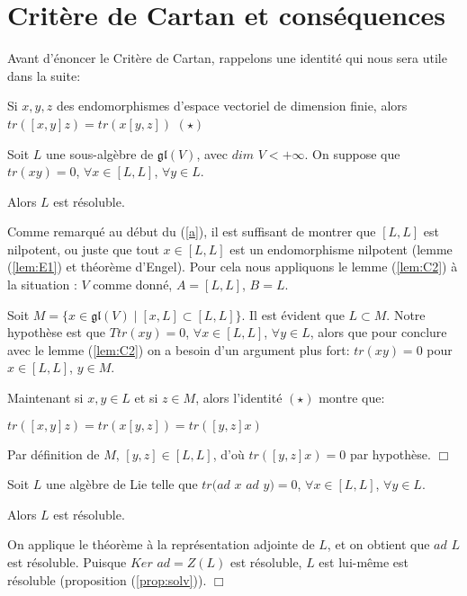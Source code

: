 \documentclass[a4paper,openany,12pt]{report}
\newcommand{\gl}{\mathfrak{gl}}
\theoremstyle{break}
{\theorembodyfont{\upshape}
\newtheorem*{rmq}{Remarque :}
\newtheorem*{prv}{Preuve :}
\newtheorem*{ex}{Exemples :}
\newtheorem*{exe}{Exemple : }
\newtheorem*{nota}{Notation :}
\newtheorem*{dem}{D\'emonstration :}}
\begin{document}
\section{Critère de Cartan et conséquences}\label{c}

Avant d'énoncer le Critère de Cartan, rappelons une identité qui nous sera utile dans la suite:  
\begin{center}
Si $x,y,z$ des endomorphismes d'espace vectoriel de dimension finie, alors $tr([x,y]z)=tr(x[y,z])$ $(\star)$
\end{center}

\begin{thm}\label{cartan}
Soit $L$ une sous-algèbre de $\gl(V)$, avec $dim$ $V<+\infty$. On suppose que $tr(xy)=0$, $\forall x \in [L,L]$, $\forall y \in L$.

Alors $L$ est résoluble. 
\end{thm}

\begin{dem}
\quad Comme remarqué au début du (\ref{a}), il est suffisant de montrer que $[L,L]$ est nilpotent, ou juste que tout $x \in [L,L]$ est un endomorphisme nilpotent (lemme (\ref{lem:E1}) et théorème d'Engel). Pour cela nous appliquons le lemme (\ref{lem:C2}) à la situation : $V$ comme donné, $A=[L,L]$, $B=L$.

Soit $M= \{ x \in \gl(V) \mid [x,L] \subset [L,L] \}$. Il est évident que $L \subset M$. Notre hypothèse est que $Ttr(xy)=0$, $\forall x \in [L,L]$, $\forall y \in L$, alors que pour conclure avec le lemme (\ref{lem:C2}) on a besoin d'un argument plus fort: \quad $tr(xy)=0$ pour $x \in [L,L]$, $y \in M$.

Maintenant si $x,y \in L$ et si $z \in M$, alors l'identité $(\star)$ montre que:
\begin{center}
$tr([x,y]z)=tr(x[y,z])=tr([y,z]x)$
\end{center}

Par définition de $M$, $[y,z] \in [L,L]$, d'où $tr([y,z]x)=0$ par hypothèse. $\Box$
\end{dem}

\begin{cor}
\quad Soit $L$ une algèbre de Lie telle que $tr(ad$ $x$ $ad$ $y) = 0$, $\forall x \in [L,L]$, $\forall y \in  L$.

Alors $L$ est résoluble.
\end{cor}

\begin{prv}
\quad On applique le théorème à la représentation adjointe de $L$, et on obtient que $ad$ $L$ est résoluble. Puisque $Ker$ $ad = Z(L)$ est résoluble, $L$ est lui-même est résoluble (proposition (\ref{prop:solv})). $\Box$
\end{prv}
\end{document}
